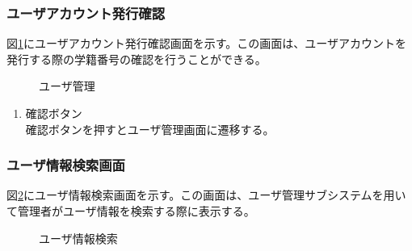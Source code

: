 \documentclass[a4j]{jarticle}
\begin{document}
\subsubsection{ユーザアカウント発行確認}
図\ref{fig:new_user}にユーザアカウント発行確認画面を示す。この画面は、ユーザアカウントを発行する際の学籍番号の確認を行うことができる。
\begin{figure}[H]
\centering
{}
\caption{ユーザ管理}
\label{fig:new_user}
\end{figure}

\begin{enumerate}
  \renewcommand{\labelenumi}{\textcircled{\scriptsize \theenumi}}

\item 確認ボタン\\
確認ボタンを押すとユーザ管理画面に遷移する。

\end{enumerate}

\subsubsection{ユーザ情報検索画面}
図\ref{fig:search_user}にユーザ情報検索画面を示す。この画面は、ユーザ管理サブシステムを用いて管理者がユーザ情報を検索する際に表示する。

\begin{figure}[H]
\centering
{}
\caption{ユーザ情報検索}
\label{fig:search_user}
\end{figure}
\end{document}
